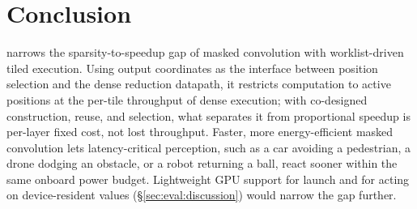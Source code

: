 \section{Conclusion}
\label{sec:conclusion}

\sysname narrows the sparsity-to-speedup gap of masked convolution with
worklist-driven tiled execution. Using output coordinates as the interface
between position selection and the dense reduction datapath, it restricts
computation to active positions at the per-tile throughput of dense execution;
with co-designed construction, reuse, and selection, what separates it from
proportional speedup is per-layer fixed cost, not lost throughput. Faster,
more energy-efficient masked convolution lets latency-critical perception,
such as a car avoiding a pedestrian, a drone dodging an obstacle, or a robot
returning a ball, react sooner within the same onboard power budget.
Lightweight GPU support for launch and for acting on device-resident values
(\S\ref{sec:eval:discussion}) would narrow the gap further.
